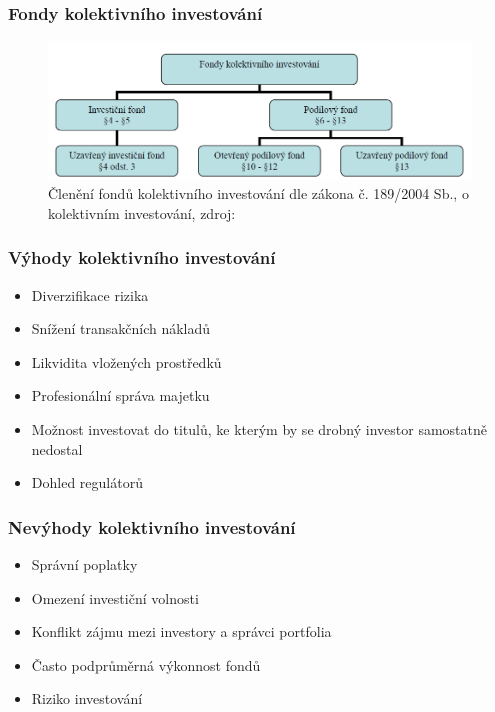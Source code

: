 \documentclass[xcolor=dvipsnames]{beamer}
\begin{document}
\begin{frame}
\frametitle{Fondy kolektivního investování}
\begin{figure}[htb]
\centering
\includegraphics[width=\textwidth]{deleni.png}
\caption{Členění fondů kolektivního investování dle zákona č. 189/2004 Sb., o kolektivním investování, zdroj: \cite{dp}}
\end{figure}
\end{frame}

  

%
%




 
\begin{frame}
  \frametitle{Výhody kolektivního investování} 
    \begin{itemize} 
\item Diverzifikace rizika
\item Snížení transakčních nákladů 
\item Likvidita vložených prostředků
\item Profesionální správa majetku
\item Možnost investovat do titulů, ke kterým by se drobný investor samostatně nedostal
\item Dohled regulátorů
\end{itemize} 
\end{frame}




\begin{frame}
\frametitle{Nevýhody kolektivního investování} 
\begin{itemize} 
\item Správní poplatky
\item Omezení investiční volnosti
\item Konflikt zájmu mezi investory a správci portfolia
\item Často podprůměrná výkonnost fondů
\item Riziko investování
\end{itemize} 
\end{frame}
\end{document}
